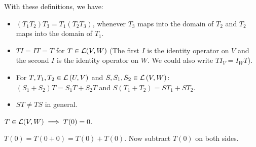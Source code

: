 \begin{thm} 
  \label{thm: algebraic properties of products of linear maps}
  With these definitions, we have:
  \begin{itemize}
    \item {} $(T_1 T_2) T_3 = T_1 (T_2 T_3)$, whenever $T_3$ maps into the domain of $T_2$ and $T_2$ maps into the domain of $T_1$.
    \item {} $T I = I T = T$ for $T \in {\mathcal{L}(V,W)}$ (The first $I$ is the identity operator on $V$ and the second $I$ is the identity operator on $W$. We could also write $T I_V = I_W T$).
    \item {} For $T, T_1, T_2 \in {\mathcal{L}\left (U, V\right )}$ and $S, S_1, S_2 \in {\mathcal{L}\left (V, W\right )}$: \\ $(S_1 + S_2)T=S_1 T + S_2 T$ and $S(T_1 + T_2)=S T_1 + S T_2$.
    \item {} $ST \neq TS$ in general.
  \end{itemize}
\end{thm}

\setcounter{thm}{9}
\begin{thm} 
  \label{thm: linear maps take 0 to 0}
  $T\in {\mathcal{L}(V,W)} \implies T(0)=0.$
\end{thm}
\begin{prf}
  $T(0) = T(0+0) = T(0) + T(0)$. Now subtract $T(0)$ on both sides.
\end{prf}